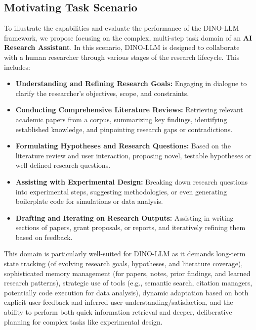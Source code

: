 \documentclass[11pt]{article}
\begin{document}
\subsection{Motivating Task Scenario}
\label{ssec:case_study_scenario}
To illustrate the capabilities and evaluate the performance of the DINO-LLM framework, we propose focusing on the complex, multi-step task domain of an \textbf{AI Research Assistant}. In this scenario, DINO-LLM is designed to collaborate with a human researcher through various stages of the research lifecycle. This includes:
\begin{itemize}
    \item \textbf{Understanding and Refining Research Goals:} Engaging in dialogue to clarify the researcher's objectives, scope, and constraints.
    \item \textbf{Conducting Comprehensive Literature Reviews:} Retrieving relevant academic papers from a corpus, summarizing key findings, identifying established knowledge, and pinpointing research gaps or contradictions.
    \item \textbf{Formulating Hypotheses and Research Questions:} Based on the literature review and user interaction, proposing novel, testable hypotheses or well-defined research questions.
    \item \textbf{Assisting with Experimental Design:} Breaking down research questions into experimental steps, suggesting methodologies, or even generating boilerplate code for simulations or data analysis.
    \item \textbf{Drafting and Iterating on Research Outputs:} Assisting in writing sections of papers, grant proposals, or reports, and iteratively refining them based on feedback.
\end{itemize}
This domain is particularly well-suited for DINO-LLM as it demands long-term state tracking (of evolving research goals, hypotheses, and literature coverage), sophisticated memory management (for papers, notes, prior findings, and learned research patterns), strategic use of tools (e.g., semantic search, citation managers, potentially code execution for data analysis), dynamic adaptation based on both explicit user feedback and inferred user understanding/satisfaction, and the ability to perform both quick information retrieval and deeper, deliberative planning for complex tasks like experimental design.
\end{document}
